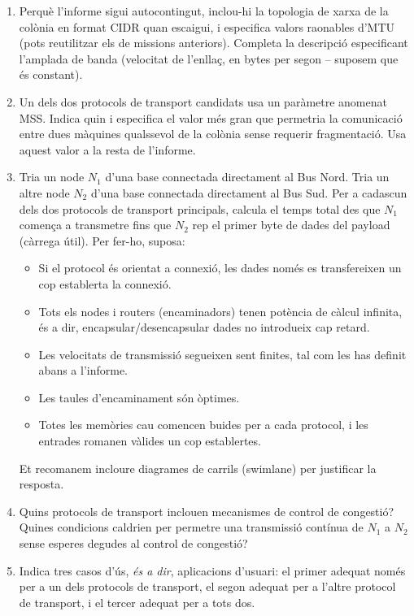 \begin{enumerate}[itemsep=0.1cm]
\item Perquè l'informe sigui autocontingut, inclou-hi la topologia de xarxa de la colònia en format CIDR quan escaigui,
i especifica valors raonables d'MTU (pots reutilitzar els de missions anteriors). Completa la descripció
especificant l'amplada de banda (velocitat de l'enllaç, en bytes per segon -- suposem que és constant).

\item Un dels dos protocols de transport candidats usa un paràmetre anomenat MSS. Indica quin i especifica el valor
més gran que permetria la comunicació entre dues màquines qualssevol de la colònia sense requerir fragmentació. Usa aquest valor a la resta de l'informe.

\item Tria un node $N_1$ d'una base connectada directament al Bus Nord. Tria un altre node $N_2$ d'una base connectada directament al Bus Sud. Per a cadascun dels dos protocols de transport principals, calcula el temps total des que $N_1$ comença a transmetre fins que $N_2$ rep el primer byte de dades del payload (càrrega útil). Per fer-ho, suposa:
  \begin{itemize}
  \item Si el protocol és orientat a connexió, les dades només es transfereixen un cop establerta la connexió.
  \item Tots els nodes i routers (encaminadors) tenen potència de càlcul infinita, és a dir, encapsular/desencapsular dades no introdueix cap retard.
  \item Les velocitats de transmissió segueixen sent finites, tal com les has definit abans a l'informe.
  \item Les taules d'encaminament són òptimes.
  \item Totes les memòries cau comencen buides per a cada protocol, i les entrades romanen vàlides un cop establertes.
  \end{itemize}
Et recomanem incloure diagrames de carrils (swimlane) per justificar la resposta.

\item Quins protocols de transport inclouen mecanismes de control de congestió? Quines condicions caldrien per permetre una transmissió contínua de $N_1$ a $N_2$ sense esperes degudes al control de congestió?

\item Indica tres casos d'ús, \textit{és a dir}, aplicacions d'usuari: el primer adequat només per a un dels protocols de transport, el segon adequat per a l'altre protocol de transport, i el tercer adequat per a tots dos.
\end{enumerate}

